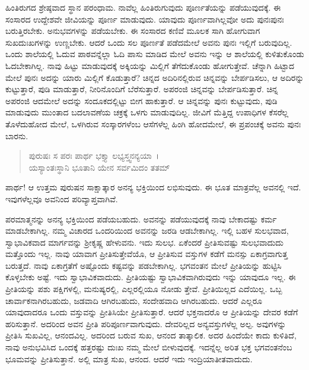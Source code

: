 ಹಿಂತಿರುಗದ ಶ್ರೇಷ್ಠವಾದ ಸ್ಥಾನ ಪರಂಧಾಮ. ನಾವೆಲ್ಲ ಹಿಂತಿರುಗುವುದು ಪೂರ್ಣತೆಯನ್ನು ಪಡೆಯುವುದಕ್ಕೆ. ಈ ಸಂಸಾರದ ಉದ್ದೇಶವೇ ಜೀವಿಯನ್ನು ಪೂರ್ಣ ಮಾಡುವುದು. ಯಾವುದು ಪೂರ್ಣವಾಗಿಲ್ಲವೋ ಅದು ಪುನಃಪುನಃ ಬರುತ್ತಿರಬೇಕು. ಅನುಭವಗಳನ್ನು ಪಡೆಯಬೇಕು. ಈ ಸಂಸಾರದ ಕಣಿವೆ ಮೂಲಕ ಸಾಗಿ ಹೋಗುವಾಗ ಸುಖದುಃಖಗಳನ್ನು ಉಣ್ಣಬೇಕು. ಆದರೆ ಒಂದು ಸಲ ಪೂರ್ಣತೆ ಪಡೆದಮೇಲೆ ಅವನು ಪುನಃ ಇಲ್ಲಿಗೆ ಬರುವುದಿಲ್ಲ. ಒಂದು ಶಾಲೆಯಲ್ಲಿ ಓದುವ ಪಾಠವನ್ನೆಲ್ಲಾ ಓದಿ ಪಾಸು ಮಾಡಿದ ಮೇಲೆ ಅವನು ಇನ್ನು ಆ ಶಾಲೆಯಲ್ಲಿ ಕುಳಿತುಕೊಂಡು ಓದಬೇಕಾಗಿಲ್ಲ. ನಾವು ಹಿಟ್ಟು ಮಾಡುವುದಕ್ಕೆ ಅಕ್ಕಿಯನ್ನು ಮಿಲ್ಲಿಗೆ ತೆಗೆದುಕೊಂಡು ಹೋಗುತ್ತೇವೆ. ಚೆನ್ನಾಗಿ ಹಿಟ್ಟಾದ ಮೇಲೆ ಪುನಃ ಅದನ್ನು ಯಾರು ಮಿಲ್ಲಿಗೆ ಕೊಡುತ್ತಾರೆ? ಚಿನ್ನದ ಅದಿರಿನಲ್ಲಿರುವ ಚಿನ್ನವನ್ನು ಬೇರ್ಪಡಿಸಲು, ಆ ಅದಿರನ್ನು ಕುಟ್ಟುತ್ತಾರೆ, ಪುಡಿ ಮಾಡುತ್ತಾರೆ, ನೀರಿನೊಂದಿಗೆ ಬೆರೆಸುತ್ತಾರೆ. ಅಪರಂಜಿ ಚಿನ್ನವನ್ನು ಬೇರ್ಪಡಿಸುತ್ತಾರೆ. ಚಿನ್ನ ಅಪರಂಜಿ ಆದಮೇಲೆ ಅದನ್ನು ಸಂದೂಕದಲ್ಲಿಟ್ಟು ಬೀಗ ಹಾಕುತ್ತಾರೆ. ಆ ಚಿನ್ನವನ್ನು ಪುನಃ ಕುಟ್ಟುವುದು, ಪುಡಿ ಮಾಡುವುದು ಮುಂತಾದ ಬದಲಾವಣೆಯ ಚಕ್ರಕ್ಕೆ ಒಳಗು ಮಾಡುವುದಿಲ್ಲ. ಜೀವಿಗೆ ಮೆತ್ತಿದ್ದ ಉಪಾಧಿಗಳ ಕೆಸರೆಲ್ಲ ತೊಳೆದುಹೋದ ಮೇಲೆ, ಒಳಗಿರುವ ಸಂಸ್ಕಾರಗಳೆಂಬ ಆಸೆಗಳೆಲ್ಲ ಹಿಂಗಿ ಹೋದಮೇಲೆ, ಈ ಪ್ರಪಂಚಕ್ಕೆ ಅವನು ಪುನಃ ಬಾರನು.

\begin{verse}
ಪುರುಷಃ ಸ ಪರಃ ಪಾರ್ಥ ಭಕ್ತ್ಯಾ ಲಭ್ಯಸ್ತ್ವನನ್ಯಯಾ~।\\ಯಸ್ಯಾಂತಃಸ್ಥಾನಿ ಭೂತಾನಿ ಯೇನ ಸರ್ವಮಿದಂ ತತಮ್ 
\end{verse}

{\small ಪಾರ್ಥ! ಆ ಉತ್ತಮ ಪುರುಷನ ಸಾಕ್ಷಾತ್ಕಾರ ಅನನ್ಯ ಭಕ್ತಿಯಿಂದ ಲಭಿಸುವುದು. ಈ ಭೂತ ಮಾತ್ರವೆಲ್ಲ ಅವನಲ್ಲಿ ಇದೆ. ಇವುಗಳೆಲ್ಲವೂ ಅವನಿಂದ ಪರಿವ್ಯಾಪ್ತವಾಗಿವೆ.}

ಪರಮಾತ್ಮನನ್ನು ಅನನ್ಯ ಭಕ್ತಿಯಿಂದ ಪಡೆಯಬಹುದು. ಅವನನ್ನು ಪಡೆಯುವುದಕ್ಕೆ ನಾವು ಬೇಕಾದಷ್ಟು ಕರ್ಮ ಮಾಡಬೇಕಾಗಿಲ್ಲ. ನಮ್ಮ ವಿಚಾರದ ಒಂದರಿಯಿಂದ ಅವನನ್ನು ಜರಡಿ ಆಡಬೇಕಾಗಿಲ್ಲ. ಇಲ್ಲಿ ಬಹಳ ಸುಲಭವಾದ, ಸ್ವಾಭಾವಿಕವಾದ ಮಾರ್ಗವನ್ನು ಶ‍್ರೀಕೃಷ್ಣ ಹೇಳುವನು. ಇದು ಸುಲಭ. ಏಕೆಂದರೆ ಪ್ರೀತಿಸುವಷ್ಟು ಸುಲಭವಾದುದು ಮತ್ತೊಂದು ಇಲ್ಲ. ನಾವು ಯಾವಾಗ ಪ್ರೀತಿಸುತ್ತೇವೆಯೊ, ಆ ಪ್ರೀತಿಸುವ ವಸ್ತುಗಳ ಕಡೆಗೆ ಮನಸ್ಸು ಏಕಾಗ್ರವಾಗುತ್ತ ಬರುತ್ತದೆ. ನಾವು ಏಕಾಗ್ರತೆಗೆ ಅಷ್ಟೊಂದು ಕಷ್ಟವನ್ನು ಪಡಬೇಕಾಗಿಲ್ಲ. ಭಗವಂತನ ಮೇಲೆ ಪ್ರೀತಿಯನ್ನು ಹುಟ್ಟಿಸಿ ಕೊಳ್ಳಬೇಕು ಅಷ್ಟೆ. ಇದು ಸ್ವಾಭಾವಿಕವಾದುದು. ಪ್ರೀತಿಯಷ್ಟು ಸ್ವಾಭಾವಿಕವಾಗಿರುವುದು ಇನ್ನು ಯಾವುದೂ ಇಲ್ಲ. ಈ ಪ್ರೀತಿಯನ್ನು ಪಶು ಪಕ್ಷಿಗಳಲ್ಲಿ, ಮನುಷ್ಯರಲ್ಲಿ, ಎಲ್ಲರಲ್ಲಿಯೂ ನೋಡು ತ್ತೇವೆ. ಪ್ರೀತಿಯಿಲ್ಲದ ಎದೆಯಿಲ್ಲ. ಒಬ್ಬ ಚಾರ್ವಾಕನಾಗಿರಬಹುದು, ಜಡವಾದಿ ಆಗಿರಬಹುದು, ಸಂದೇಹವಾದಿ ಆಗಿರಬಹುದು. ಆದರೆ ಎಲ್ಲರೂ ಯಾವುದಾದರೂ ಒಂದು ವಸ್ತುವನ್ನು ಪ್ರೀತಿಸಿಯೇ ಪ್ರೀತಿಸುತ್ತಾರೆ. ಆದರೆ ಭಕ್ತನಾದರೊ ಆ ಪ್ರೀತಿಯನ್ನು ದೇವರ ಕಡೆಗೆ ಹರಿಸುತ್ತಾನೆ. ಅದರಿಂದ ಅವನ ಪ್ರೀತಿ ಪರಿಪೂರ್ಣವಾಗುವುದು. ದೇವರಿಲ್ಲದ ಅನ್ಯವಸ್ತುಗಳೆಲ್ಲ ಅಲ್ಪ. ಅವುಗಳನ್ನು ಪ್ರೀತಿಸಿ ಸುಖವಿಲ್ಲ, ಆನಂದವಿಲ್ಲ. ಅದರಿಂದ ಬರುವ ಸುಖ, ಆನಂದ ತಾತ್ಕಾಲಿಕ. ಅದರ ಹಿಂದೆಯೇ ಕಾದು ಕುಳಿತಿದೆ, ನಾವು ಅನುಭವಿಸಿದ ಒಂದಕ್ಕೆ ಹತ್ತರಷ್ಟು ದುಃಖ ನಮ್ಮ ಮೇಲೆ ಬೀಳುವುದಕ್ಕೆ. ಇದನ್ನೆಲ್ಲ ಅರಿತ ಭಕ್ತ ಭಗವಂತನೆಂಬ ಭೂಮವನ್ನು ಪ್ರೀತಿಸುತ್ತಾನೆ. ಅಲ್ಲಿ ಮಾತ್ರ ಸುಖ, ಆನಂದ. ಆದರೆ ಇದು ಇಂದ್ರಿಯಾತೀತವಾದುದು.

